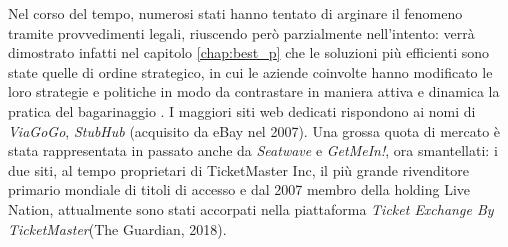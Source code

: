 Nel corso del tempo, numerosi stati hanno tentato di arginare il fenomeno tramite provvedimenti legali, riuscendo però parzialmente nell'intento: verrà dimostrato infatti nel capitolo \ref{chap:best_p} che le soluzioni più efficienti sono state quelle di ordine strategico, in cui le aziende coinvolte hanno modificato le loro strategie e politiche in modo da contrastare in maniera attiva e dinamica la pratica del bagarinaggio \cite{drayer2011examining}. 
I maggiori siti web dedicati rispondono ai nomi di \textit{ViaGoGo}, \textit{StubHub} (acquisito da eBay nel 2007). Una grossa quota di mercato è stata rappresentata in passato anche da \textit{Seatwave} e \textit{GetMeIn!}, ora smantellati: i due siti, al tempo proprietari di TicketMaster Inc, il più grande rivenditore primario mondiale di titoli di accesso e dal 2007 membro della holding Live Nation, attualmente sono stati accorpati nella piattaforma \textit{Ticket Exchange By TicketMaster}(The Guardian, 2018).

